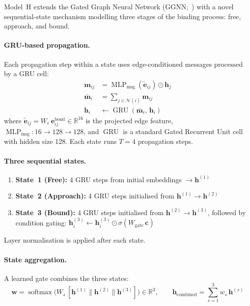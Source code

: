 \documentclass[11pt]{article}
\begin{document}
Model~H extends the Gated Graph Neural Network (GGNN;~\cite{li2016gated})
with a novel sequential-state mechanism modelling three stages of the
binding process: free, approach, and bound.

\paragraph{GRU-based propagation.}
Each propagation step within a state uses edge-conditioned messages
processed by a GRU cell:
\begin{align}
  \mathbf{m}_{ij} &= \operatorname{MLP}_{\mathrm{msg}}(
    \tilde{\mathbf{e}}_{ij}) \odot \mathbf{h}_j \\
  \bar{\mathbf{m}}_i &= \sum_{j \in \mathcal{N}(i)} \mathbf{m}_{ij} \\
  \mathbf{h}_i &\leftarrow \operatorname{GRU}(
    \bar{\mathbf{m}}_i,\, \mathbf{h}_i)
  \label{eq:ggnn_gru}
\end{align}
where $\tilde{\mathbf{e}}_{ij} = W_e\, \mathbf{e}_{ij}^{\mathrm{bond}}
\in \mathbb{R}^{16}$ is the projected edge feature,
$\operatorname{MLP}_{\mathrm{msg}}: 16 \to 128 \to 128$,
and $\operatorname{GRU}$ is a standard Gated Recurrent Unit cell with
hidden size 128.
Each state runs $T = 4$ propagation steps.

\paragraph{Three sequential states.}
\begin{enumerate}[leftmargin=1.5em]
  \item \textbf{State~1 (Free):} 4 GRU steps from initial embeddings
    $\to \mathbf{h}^{(1)}$
  \item \textbf{State~2 (Approach):} 4 GRU steps initialised from
    $\mathbf{h}^{(1)} \to \mathbf{h}^{(2)}$
  \item \textbf{State~3 (Bound):} 4 GRU steps initialised from
    $\mathbf{h}^{(2)} \to \mathbf{h}^{(3)}$, followed by condition
    gating:
    $\mathbf{h}^{(3)}_i \leftarrow \mathbf{h}^{(3)}_i \odot
    \sigma(W_{\mathrm{gate}}\, \mathbf{c})$
\end{enumerate}
Layer normalisation is applied after each state.

\paragraph{State aggregation.}
A learned gate combines the three states:
\begin{equation}
  \mathbf{w} = \operatorname{softmax}\!\bigl(
    W_s\, [\mathbf{h}^{(1)} \| \mathbf{h}^{(2)} \| \mathbf{h}^{(3)}]
  \bigr) \in \mathbb{R}^{3}, \qquad
  \mathbf{h}_{\mathrm{combined}} = \sum_{s=1}^{3}
  w_s\, \mathbf{h}^{(s)}
  \label{eq:ggnn_gate}
\end{equation}
\end{document}
